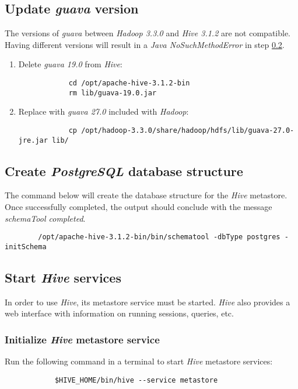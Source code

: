 \documentclass{article}
\begin{document}
    \subsection{Update \emph{guava} version}
    The versions of \emph{guava} between \emph{Hadoop 3.3.0} and \emph{Hive 3.1.2} are not compatible.
    Having different versions will result in a \emph{Java NoSuchMethodError} in step \ref{subsec:schematool}.
    \begin{enumerate}
        \item Delete \emph{guava 19.0} from \emph{Hive}:
        \begin{verbatim}
            cd /opt/apache-hive-3.1.2-bin
            rm lib/guava-19.0.jar
        \end{verbatim}

        \item Replace with \emph{guava 27.0} included with \emph{Hadoop}:
        \begin{verbatim}
            cp /opt/hadoop-3.3.0/share/hadoop/hdfs/lib/guava-27.0-jre.jar lib/
        \end{verbatim}
    \end{enumerate}

    \subsection{Create \emph{PostgreSQL} database structure}
    \label{subsec:schematool}
    The command below will create the database structure for the \emph{Hive} metastore. Once
    successfully completed, the output should conclude with the message \emph{schemaTool completed}.
    \begin{verbatim}
        /opt/apache-hive-3.1.2-bin/bin/schematool -dbType postgres -initSchema
    \end{verbatim}

    \subsection{Start \emph{Hive} services}
    \label{subsec:hiveservices}
    In order to use \emph{Hive}, its metastore service must be started. \emph{Hive} also provides
    a web interface with information on running sessions, queries, etc.

        \subsubsection{Initialize \emph{Hive} metastore service}
        Run the following command in a terminal to start \emph{Hive} metastore services:
        \begin{verbatim}
            $HIVE_HOME/bin/hive --service metastore
        \end{verbatim}
\end{document}
